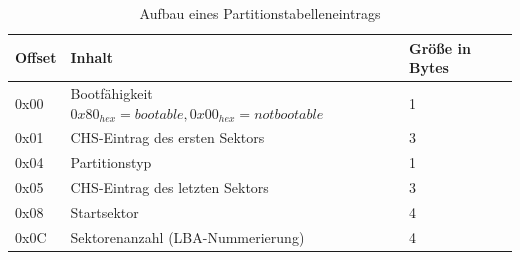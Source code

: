 \documentclass[11pt,a4paper]{article}
\begin{document}
\begin{table}[h]
	\begin{center}
		\begin{tabular}[c]{  l | l | l }
		\cellcolor{grey} Offset & \cellcolor{grey} Inhalt & \cellcolor{grey} Größe in Bytes \\ \hline
		0x00 & Bootfähigkeit \(0x80_{hex}=bootable, 0x00_{hex}=not bootable\) & 1\\ \hline
		0x01 & CHS-Eintrag des ersten Sektors & 3 \\ \hline
		0x04 & Partitionstyp & 1 \\ \hline
		0x05 & CHS-Eintrag des letzten Sektors & 3 \\ \hline
		0x08 & Startsektor & 4 \\ \hline
		0x0C & Sektorenanzahl (LBA-Nummerierung) & 4\\
		\end{tabular}
	\end{center}
	
	\caption{Aufbau eines Partitionstabelleneintrags}
	\label{tab:mbr_partentry_tbl}
\end{table}

\pagebreak{}
\end{document}
